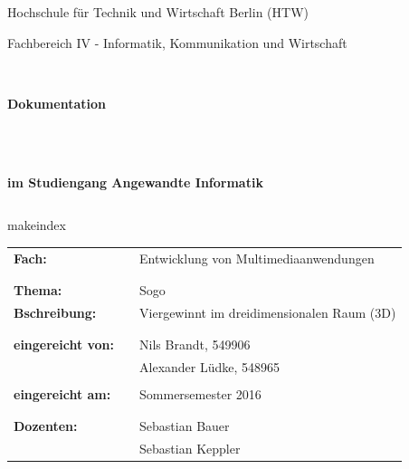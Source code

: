 \documentclass[a4paper]{scrartcl}
\begin{document}
\renewcommand\lstlistingname{Quellcode}	%
%
%
\thispagestyle{empty}

\begin{center}
\Large{Hochschule für Technik und Wirtschaft Berlin (HTW)}\\
\end{center}
 
 
\begin{center}
\Large{Fachbereich IV - Informatik, Kommunikation und Wirtschaft}
\end{center}
\begin{verbatim}


\end{verbatim}
\begin{center}
\textbf{\LARGE{Dokumentation}}
\end{center}
\begin{verbatim}
 
 
\end{verbatim}
\begin{center}
\textbf{im Studiengang Angewandte Informatik}
\end{center}
\begin{verbatim}
\end{verbatim}
 
\begin{flushleft}makeindex %
\begin{tabular}{lll}
\textbf{Fach:} & & Entwicklung von Multimediaanwendungen\\
& & \\
& & \\
\textbf{Thema:} & & Sogo\\
\textbf{Bschreibung:}& & Viergewinnt im dreidimensionalen Raum (3D) \\
& & \\
& & \\
\textbf{eingereicht von:} & & Nils Brandt, 549906 \\
& & Alexander Lüdke, 548965 \\
& & \\
\textbf{eingereicht am:} & &  Sommersemester 2016 \\
& & \\
& & \\
\textbf{Dozenten:} & & Sebastian Bauer \\
& & 	Sebastian Keppler
\end{tabular}
\end{flushleft}
\end{document}
